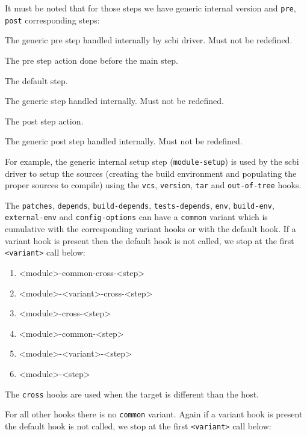 \documentclass[a4paper,12pt,twoside]{article}
\newcommand{\code}[1]{\texttt{#1}}
\begin{document}
It must be noted that for those steps we have generic internal version and \code{pre}, \code{post} corresponding steps:

\begin{description}[font=\texttt,style=nextline]
	\item[module-pre-<step>] The generic pre step handled internally by scbi driver. Must not be redefined.
	\item[<module>-pre-<step>] The pre step action done before the main step.
	\item[<module>-<step>] The default step.
	\item[module-<step>] The generic step handled internally. Must not be redefined.
	\item[<module>-post-<step>] The post step action.
	\item[module-post-<step>] The generic post step handled internally. Must not be redefined.
\end{description}

For example, the generic internal setup step (\code{module-setup}) is used by the scbi driver to setup the sources (creating the build environment and populating the proper sources to compile) using the \code{vcs}, \code{version}, \code{tar} and \code{out-of-tree} hooks.

The \code{patches}, \code{depends}, \code{build-depends}, \code{tests-depends}, \code{env}, \code{build-env}, \code{external-env} and \code{config-options} can have a \code{common} variant which is cumulative with the corresponding variant hooks or with the default hook. If a variant hook is present then the default hook is not called, we stop at the first \code{<variant>} call below:

\begin{enumerate}
	\item <module>-common-cross-<step>
	\item <module>-<variant>-cross-<step>
	\item <module>-cross-<step>
	\item <module>-common-<step>
	\item <module>-<variant>-<step>
	\item <module>-<step>
\end{enumerate}

The \code{cross} hooks are used when the target is different than the host.

For all other hooks there is no \code{common} variant. Again if a variant hook is present the default hook is not called, we stop at the first \code{<variant>} call below:
\end{document}
